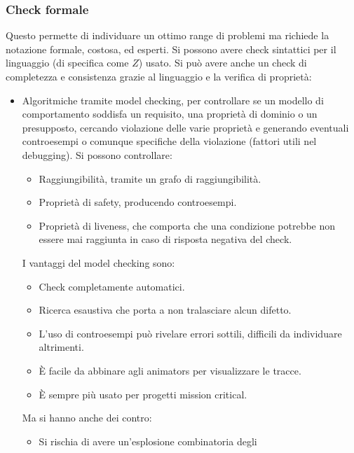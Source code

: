 \subsubsection{Check formale}
Questo permette di individuare un ottimo range di problemi ma richiede la notazione
formale, costosa, ed esperti. Si possono avere check sintattici per il linguaggio
(di specifica come $Z$) usato. Si può avere anche un check di completezza e
consistenza grazie al linguaggio e la verifica di proprietà:
\begin{itemize}
      \item Algoritmiche tramite model checking, per controllare se un modello di
            comportamento soddisfa un requisito, una proprietà di dominio o un
            presupposto, cercando violazione delle varie proprietà e generando
            eventuali controesempi o comunque specifiche della violazione
            (fattori utili nel debugging). Si possono controllare:
            \begin{itemize}
                  \item Raggiungibilità, tramite un grafo di raggiungibilità.
                  \item Proprietà di safety, producendo controesempi.
                  \item Proprietà di liveness, che comporta che una condizione
                        potrebbe non essere mai raggiunta in caso di risposta
                        negativa del check.
            \end{itemize}
            I vantaggi del model checking sono:
            \begin{itemize}
                  \item Check completamente automatici.
                  \item Ricerca esaustiva che porta a non tralasciare alcun
                        difetto.
                  \item L'uso di controesempi può rivelare errori sottili,
                        difficili da individuare altrimenti.
                  \item È facile da abbinare agli animators per visualizzare le
                        tracce.
                  \item È sempre più usato per progetti mission critical.
            \end{itemize}
            Ma si hanno anche dei contro:
            \begin{itemize}
                  \item Si rischia di avere un'esplosione combinatoria degli

\end{itemize}
\end{itemize}

